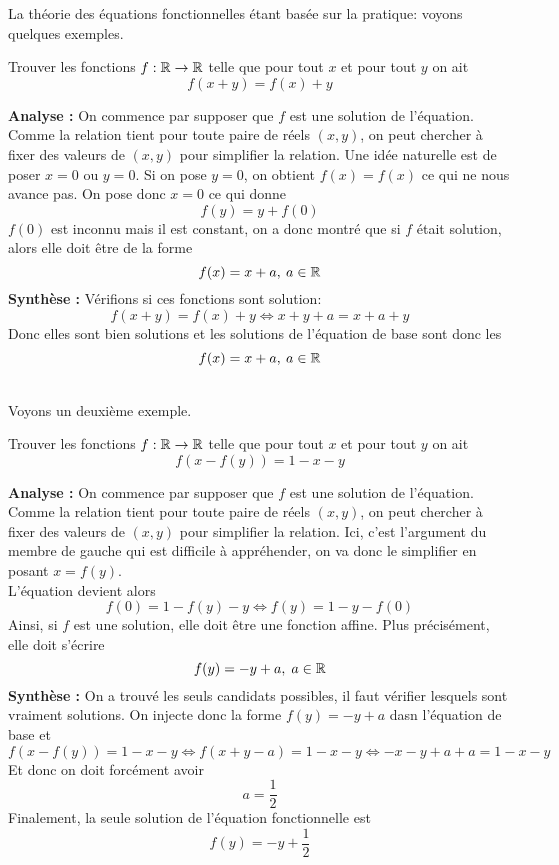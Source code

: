 La théorie  des équations fonctionnelles étant basée sur la pratique: voyons quelques exemples.
\begin{ex}
Trouver les fonctions $f:\mathbb R\to \mathbb R$ telle que pour tout $x$ et pour tout $y$ on ait
$$f(x+y)=f(x)+y $$
\end{ex}
\begin{preuve}
\textbf{Analyse :}
On commence par supposer que $f$ est une solution de l'équation.
\\

Comme la relation tient pour toute paire de réels $(x,y)$, on peut chercher à fixer des valeurs de $(x,y)$ pour simplifier la relation. Une idée naturelle est de poser $x=0$ ou $y=0$. Si on pose $y=0$, on obtient $f(x)=f(x)$ ce qui ne nous avance pas. On pose donc $x=0$ ce qui donne 
$$f(y)=y+f(0) $$
$f(0)$ est inconnu mais il est constant, on a donc montré que si $f$ était solution, alors elle doit être de la forme 
$$f(x)=x+a, \: a\in \mathbb R $$
\textbf{Synthèse :} Vérifions si ces fonctions sont solution:
$$f(x+y)=f(x)+y\iff x+y+a=x+a+y $$
Donc elles sont bien solutions et les solutions de l'équation de base sont donc les 
$$f(x)=x+a, \: a\in \mathbb R $$
\end{preuve}
\\
Voyons un deuxième exemple.
\begin{ex}
Trouver les fonctions $f:\mathbb R\to \mathbb R$ telle que pour tout $x$ et pour tout $y$ on ait
$$f(x-f(y))=1-x-y $$
\end{ex}

\begin{preuve}
\textbf{Analyse :}
On commence par supposer que $f$ est une solution de l'équation.
\\

Comme la relation tient pour toute paire de réels $(x,y)$, on peut chercher à fixer des valeurs de $(x,y)$ pour simplifier la relation. Ici, c'est l'argument du membre de gauche qui est difficile à appréhender, on va donc le simplifier en posant $x=f(y)$.
\\
L'équation devient alors
$$f(0)=1-f(y)-y\iff f(y)=1-y-f(0) $$
Ainsi, si $f$ est une solution, elle doit être une fonction affine. Plus précisément, elle doit s'écrire 
$$f(y)=-y+a, \; a\in \mathbb R $$
\textbf{Synthèse :}
On a trouvé les seuls candidats possibles, il faut vérifier lesquels sont vraiment solutions. On injecte donc la forme $f(y)=-y+a$ dasn l'équation de base et 
$$f(x-f(y))=1-x-y\iff f(x+y-a)=1-x-y\iff -x-y+a+a=1-x-y $$
Et donc on doit forcément avoir
$$a=\frac{1}{2} $$
Finalement, la seule solution de l'équation fonctionnelle est 
$$f(y)=-y+\frac{1}{2} $$
\end{preuve}

